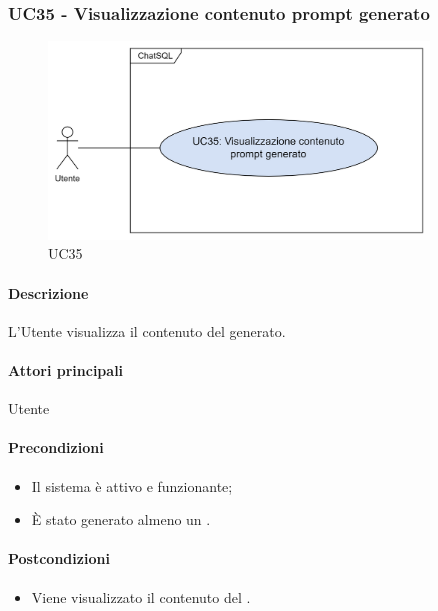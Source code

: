 \subsubsection{UC35 - Visualizzazione contenuto prompt generato}\label{UC35}

\begin{figure}[H]
  \centering
  \includegraphics[width=0.90\textwidth]{assets/uc35.png}
  \caption{UC35}
\end{figure}

\paragraph*{Descrizione}
L'Utente visualizza il contenuto del  generato.

\paragraph*{Attori principali}
Utente

\paragraph*{Precondizioni}
\begin{itemize}
  \item Il sistema è attivo e funzionante;
  \item È stato generato almeno un .
\end{itemize}

\paragraph*{Postcondizioni}
\begin{itemize}
  \item Viene visualizzato il contenuto del .
\end{itemize}

